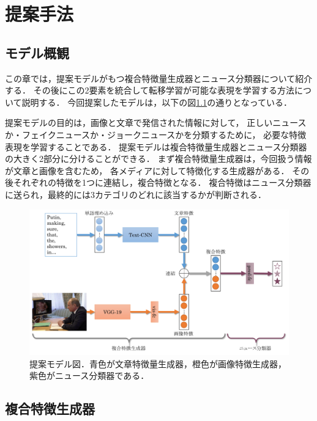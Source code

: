 %
\chapter{提案手法}
%
\section{モデル概観}
この章では，提案モデルがもつ複合特徴量生成器とニュース分類器について紹介する．
その後にこの2要素を統合して転移学習が可能な表現を学習する方法について説明する．
今回提案したモデルは，以下の図\ref{fig:model}の通りとなっている．

提案モデルの目的は，画像と文章で発信された情報に対して，
正しいニュースか・フェイクニュースか・ジョークニュースかを分類するために，
必要な特徴表現を学習することである．
提案モデルは複合特徴量生成器とニュース分類器の大きく2部分に分けることができる．
まず複合特徴量生成器は，今回扱う情報が文章と画像を含むため，
各メディアに対して特徴化する生成器がある．
その後それぞれの特徴を1つに連結し，複合特徴となる．
複合特徴はニュース分類器に送られ，最終的には3カテゴリのどれに該当するかが判断される．
% 
\begin{figure}[h]
    \centering
    \includegraphics[width=\linewidth]{images/methodology.pdf}
    \caption{提案モデル図．青色が文章特徴量生成器，橙色が画像特徴生成器，紫色がニュース分類器である．}
    \label{fig:model}
\end{figure}
%
\section{複合特徴生成器}
%
